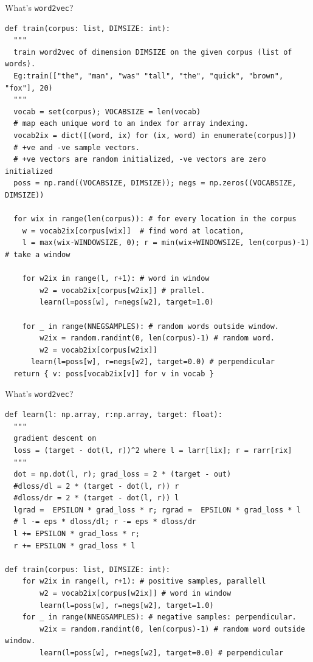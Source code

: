 \documentclass[8pt]{beamer}
\begin{document}
\begin{frame}[fragile]{What's \texttt{word2vec}?}
\begin{verbatim}
def train(corpus: list, DIMSIZE: int):
  """
  train word2vec of dimension DIMSIZE on the given corpus (list of words).
  Eg:train(["the", "man", "was" "tall", "the", "quick", "brown", "fox"], 20)
  """
  vocab = set(corpus); VOCABSIZE = len(vocab)
  # map each unique word to an index for array indexing.
  vocab2ix = dict([(word, ix) for (ix, word) in enumerate(corpus)])
  # +ve and -ve sample vectors.
  # +ve vectors are random initialized, -ve vectors are zero initialized
  poss = np.rand((VOCABSIZE, DIMSIZE)); negs = np.zeros((VOCABSIZE, DIMSIZE))

  for wix in range(len(corpus)): # for every location in the corpus
    w = vocab2ix[corpus[wix]]  # find word at location,
    l = max(wix-WINDOWSIZE, 0); r = min(wix+WINDOWSIZE, len(corpus)-1) # take a window

    for w2ix in range(l, r+1): # word in window
        w2 = vocab2ix[corpus[w2ix]] # prallel.
        learn(l=poss[w], r=negs[w2], target=1.0)

    for _ in range(NNEGSAMPLES): # random words outside window. 
        w2ix = random.randint(0, len(corpus)-1) # random word.
        w2 = vocab2ix[corpus[w2ix]] 
      learn(l=poss[w], r=negs[w2], target=0.0) # perpendicular
  return { v: poss[vocab2ix[v]] for v in vocab } 
\end{verbatim}
\end{frame}

\begin{frame}[fragile]{What's \texttt{word2vec}?}
\begin{verbatim}
def learn(l: np.array, r:np.array, target: float):
  """
  gradient descent on
  loss = (target - dot(l, r))^2 where l = larr[lix]; r = rarr[rix]
  """
  dot = np.dot(l, r); grad_loss = 2 * (target - out)
  #dloss/dl = 2 * (target - dot(l, r)) r
  #dloss/dr = 2 * (target - dot(l, r)) l
  lgrad =  EPSILON * grad_loss * r; rgrad =  EPSILON * grad_loss * l
  # l -= eps * dloss/dl; r -= eps * dloss/dr
  l += EPSILON * grad_loss * r;
  r += EPSILON * grad_loss * l

def train(corpus: list, DIMSIZE: int):
    for w2ix in range(l, r+1): # positive samples, parallell
        w2 = vocab2ix[corpus[w2ix]] # word in window
        learn(l=poss[w], r=negs[w2], target=1.0)
    for _ in range(NNEGSAMPLES): # negative samples: perpendicular. 
        w2ix = random.randint(0, len(corpus)-1) # random word outside window.
        learn(l=poss[w], r=negs[w2], target=0.0) # perpendicular
\end{verbatim}
\end{frame}
\end{document}
